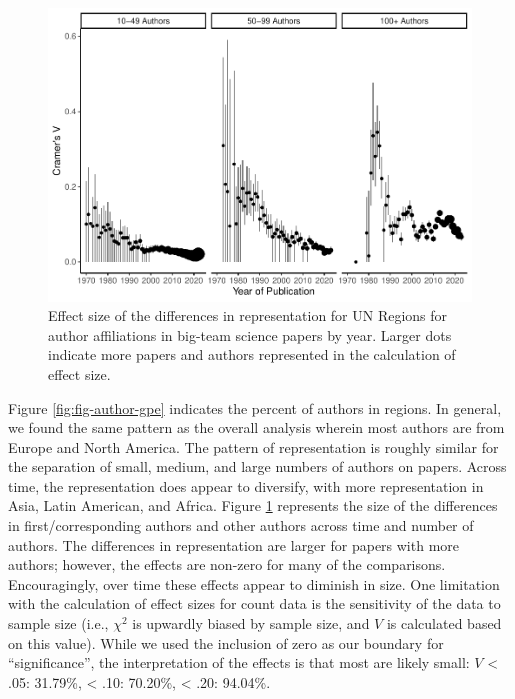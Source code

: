\documentclass[
  man,floatsintext]{apa6}
\begin{document}
\begin{figure}
\centering
\includegraphics{manuscript_scopus_files/figure-latex/fig-effect-gpe-1.pdf}
\caption{\label{fig:fig-effect-gpe}Effect size of the differences in representation for UN Regions for author affiliations in big-team science papers by year. Larger dots indicate more papers and authors represented in the calculation of effect size.}
\end{figure}

Figure \ref{fig:fig-author-gpe} indicates the percent of authors in regions. In general, we found the same pattern as the overall analysis wherein most authors are from Europe and North America. The pattern of representation is roughly similar for the separation of small, medium, and large numbers of authors on papers. Across time, the representation does appear to diversify, with more representation in Asia, Latin American, and Africa. Figure \ref{fig:fig-effect-gpe} represents the size of the differences in first/corresponding authors and other authors across time and number of authors. The differences in representation are larger for papers with more authors; however, the effects are non-zero for many of the comparisons. Encouragingly, over time these effects appear to diminish in size. One limitation with the calculation of effect sizes for count data is the sensitivity of the data to sample size (i.e., \(\chi^2\) is upwardly biased by sample size, and \(V\) is calculated based on this value). While we used the inclusion of zero as our boundary for ``significance'', the interpretation of the effects is that most are likely small: \(V\) \textless{} .05: 31.79\%, \textless{} .10: 70.20\%, \textless{} .20: 94.04\%.
\end{document}
